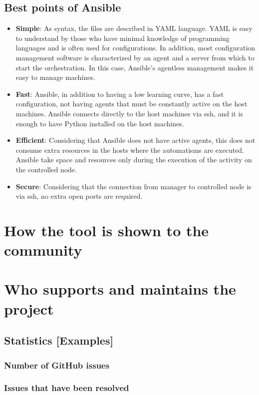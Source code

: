 \documentclass[12pt,a4paper,openright,twoside]{book}
\begin{document}
\subsection{Best points of Ansible}
\begin{itemize}
    \item \textbf{Simple}: As syntax, the files are described in YAML language. YAML is easy to understand by those who have minimal knowledge of programming languages and is often used for configurations. In addition, most configuration management software is characterized by an agent and a server from which to start the orchestration. In this case, Ansible's agentless management makes it easy to manage machines.
    \item \textbf{Fast}: Ansible, in addition to having a low learning curve, has a fast configuration, not having agents that must be constantly active on the host machines. Ansible connects directly to the host machines via ssh, and it is enough to have Python installed on the host machines.
    \item \textbf{Efficient}: Considering that Ansible does not have active agents, this does not consume extra resources in the hosts where the automatisms are executed. Ansible take space and resources only during the execution of the activity on the controlled node.
    \item \textbf{Secure}: Considering that the connection from manager to controlled node is via ssh, no extra open ports are required.
\end{itemize}

\section{How the tool is shown to the community}

\section{Who supports and maintains the project}
\subsection{Statistics [Examples]}
            \subsubsection{Number of GitHub issues}
            \subsubsection{Issues that have been resolved}
\end{document}
